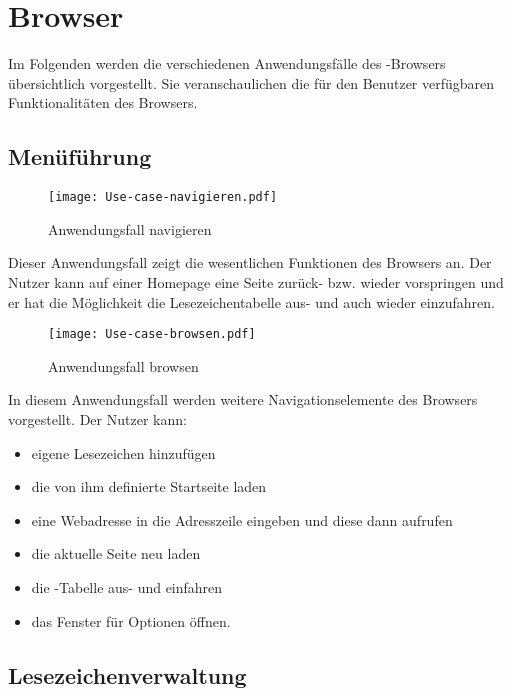 
\chapter{Browser}
Im Folgenden werden die verschiedenen Anwendungsfälle des \SECH-Browsers übersichtlich vorgestellt. Sie veranschaulichen die für den Benutzer verfügbaren Funktionalitäten des Browsers.

\section{Menüführung}

\begin{figure}[htb]
\centering
\texttt{[image: Use-case-navigieren.pdf]}
	\caption{Anwendungsfall \glqq navigieren\grqq\xspace}
\end{figure}

Dieser Anwendungsfall zeigt die wesentlichen Funktionen des Browsers an. Der Nutzer kann auf einer Homepage eine Seite zurück- bzw. wieder vorspringen und er hat die Möglichkeit die Lesezeichentabelle aus- und auch wieder einzufahren.

\begin{figure}[htb]
\centering
\texttt{[image: Use-case-browsen.pdf]}
	\caption{Anwendungsfall \glqq browsen\grqq\xspace}
\end{figure}

In diesem Anwendungsfall werden weitere Navigationselemente des Browsers vorgestellt. Der Nutzer kann:

\begin{itemize}
	\item eigene Lesezeichen hinzufügen
	\item die von ihm definierte Startseite laden
	\item eine Webadresse in die Adresszeile eingeben und diese dann aufrufen
	\item die aktuelle Seite neu laden
	\item die \SEARCH-Tabelle aus- und einfahren
	\item das Fenster für Optionen öffnen.
\end{itemize}
\pagebreak

\section{Lesezeichenverwaltung}

